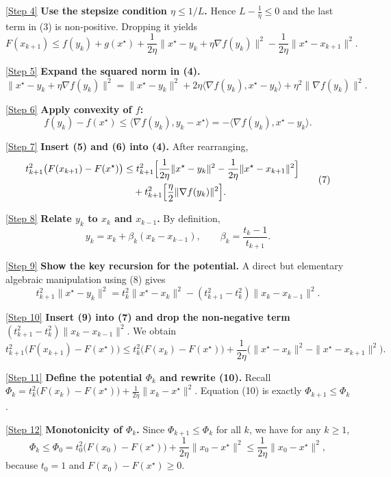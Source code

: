 \documentclass{article}
\newcommand{\grad}{\nabla}
\begin{document}
\noindent\underline{[Step 4]} \textbf{Use the stepsize condition $\eta\le 1/L$.} Hence $L-\frac{1}{\eta}\le 0$ and the last term in (3) is non‑positive. Dropping it yields
\[
F(x_{k+1}) \le f(y_k)+g(x^\star) +\frac{1}{2\eta}\|x^\star-y_k+\eta\grad f(y_k)\|^{2}
-\frac{1}{2\eta}\|x^\star-x_{k+1}\|^{2}.
\tag{4}
\]

\noindent\underline{[Step 5]} \textbf{Expand the squared norm in (4).}
\[
\|x^\star-y_k+\eta\grad f(y_k)\|^{2}
= \|x^\star-y_k\|^{2} +2\eta\langle\grad f(y_k),x^\star-y_k\rangle + \eta^{2}\|\grad f(y_k)\|^{2}.
\tag{5}
\]

\noindent\underline{[Step 6]} \textbf{Apply convexity of $f$:}
\[
f(y_k)-f(x^\star)\le \langle\grad f(y_k),y_k-x^\star\rangle = -\langle\grad f(y_k),x^\star-y_k\rangle .
\tag{6}
\]

\noindent\underline{[Step 7]} \textbf{Insert (5) and (6) into (4).} After rearranging,
\[
\begin{aligned}
t_{k+1}^{2}\bigl(F(x_{k+1})-F(x^\star)\bigr)
&\le t_{k+1}^{2}\Bigl[\frac{1}{2\eta}\|x^\star-y_k\|^{2}
-\frac{1}{2\eta}\|x^\star-x_{k+1}\|^{2}\Bigr]   \\
&\quad + t_{k+1}^{2}\Bigl[\frac{\eta}{2}\|\grad f(y_k)\|^{2}\Bigr].
\end{aligned}
\tag{7}
\]

\noindent\underline{[Step 8]} \textbf{Relate $y_k$ to $x_k$ and $x_{k-1}$.} By definition,
\[
y_k = x_k + \beta_k(x_k-x_{k-1}),\qquad \beta_k=\frac{t_k-1}{t_{k+1}}.
\tag{8}
\]

\noindent\underline{[Step 9]} \textbf{Show the key recursion for the potential.}
A direct but elementary algebraic manipulation using (8) gives
\[
t_{k+1}^{2}\|x^\star-y_k\|^{2}
= t_k^{2}\|x^\star-x_k\|^{2} - (t_{k+1}^{2}-t_k^{2})\|x_k-x_{k-1}\|^{2}.
\tag{9}
\]

\noindent\underline{[Step 10]} \textbf{Insert (9) into (7) and drop the non‑negative term
$(t_{k+1}^{2}-t_k^{2})\|x_k-x_{k-1}\|^{2}$}. We obtain
\[
t_{k+1}^{2}\bigl(F(x_{k+1})-F(x^\star)\bigr)
\le t_k^{2}\bigl(F(x_k)-F(x^\star)\bigr)
+ \frac{1}{2\eta}\bigl(\|x^\star-x_k\|^{2}-\|x^\star-x_{k+1}\|^{2}\bigr).
\tag{10}
\]

\noindent\underline{[Step 11]} \textbf{Define the potential $\Phi_k$ and rewrite (10).}
Recall $\Phi_k = t_k^{2}\bigl(F(x_k)-F(x^\star)\bigr) + \frac{1}{2\eta}\|x_k-x^\star\|^{2}$.  
Equation (10) is exactly $\Phi_{k+1}\le \Phi_k$.

\noindent\underline{[Step 12]} \textbf{Monotonicity of $\Phi_k$.} Since $\Phi_{k+1}\le\Phi_k$ for all $k$, we have for any $k\ge1$,
\[
\Phi_k \le \Phi_0
= t_0^{2}\bigl(F(x_0)-F(x^\star)\bigr)+\frac{1}{2\eta}\|x_0-x^\star\|^{2}
\le \frac{1}{2\eta}\|x_0-x^\star\|^{2},
\]
because $t_0=1$ and $F(x_0)-F(x^\star)\ge0$.
\end{document}
